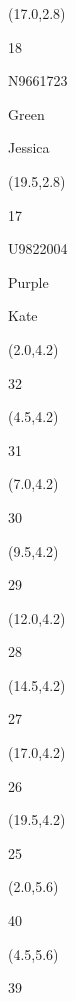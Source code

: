 \documentclass[a4paper]{article}
\newcommand{\myseat}[5]{%
\vspace{-0.1cm} \hspace{-0.5cm}
\parbox[t][2.2cm][t]{3.5cm}{%
\small #1 %
\begin{description}
\vspace{-0.1cm}
\item [ID:] #2
\vspace{-0.1cm}
\item [Team:] #3 \normalsize
\vspace{-0.1cm}
\item \normalsize #4 #5
\vspace{-0.1cm}
\end{description}
}
}
\begin{document}
\begin{CJK}{UTF8}{cyberbit}
\begin{textblock}{2.5}(17.0,2.8)
\myseat{18}{N9661723}{Green}{Jessica}{}
\end{textblock}

\begin{textblock}{2.5}(19.5,2.8)
\myseat{17}{U9822004}{Purple}{Kate}{}
\end{textblock}


\begin{textblock}{2.5}(2.0,4.2)
\textblockcolor{}
\myseat{32}{}{}{}{}
\end{textblock}

\begin{textblock}{2.5}(4.5,4.2)
\textblockcolor{}
\myseat{31}{}{}{}{}
\end{textblock}

\begin{textblock}{2.5}(7.0,4.2)
\textblockcolor{}
\myseat{30}{}{}{}{}
\end{textblock}

\begin{textblock}{2.5}(9.5,4.2)
\textblockcolor{}
\myseat{29}{}{}{}{}
\end{textblock}

\begin{textblock}{2.5}(12.0,4.2)
\textblockcolor{}
\myseat{28}{}{}{}{}
\end{textblock}

\begin{textblock}{2.5}(14.5,4.2)
\textblockcolor{}
\myseat{27}{}{}{}{}
\end{textblock}

\begin{textblock}{2.5}(17.0,4.2)
\textblockcolor{}
\myseat{26}{}{}{}{}
\end{textblock}

\begin{textblock}{2.5}(19.5,4.2)
\textblockcolor{}
\myseat{25}{}{}{}{}
\end{textblock}


\begin{textblock}{2.5}(2.0,5.6)
\textblockcolor{}
\myseat{40}{}{}{}{}
\end{textblock}

\begin{textblock}{2.5}(4.5,5.6)
\textblockcolor{}
\myseat{39}{}{}{}{}
\end{textblock}


\end{CJK}
\end{document}
